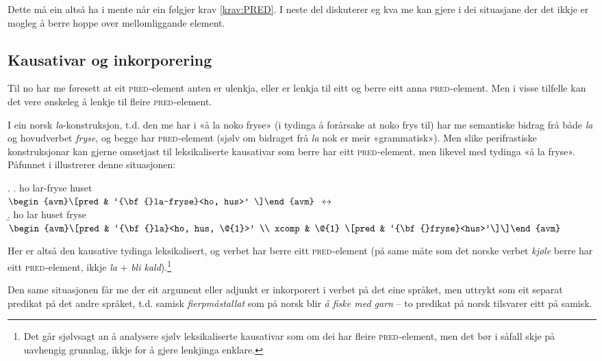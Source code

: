 \documentclass[11pt,a4paper,oneside,draft]{book}
\newcommand{\F}[2]{\textsc{#1}\ensuremath{_{#2}}}
\newcommand{\PRED}{\F{pred}{}}
\begin{document}
 Dette må ein altså ha i mente når ein følgjer krav \ref{krav:PRED}. I
 neste del diskuterer eg kva me kan gjere i dei situasjane der det
 ikkje er mogleg å berre hoppe over mellomliggande element.

\subsection{Kausativar og inkorporering}
\label{sec-3.6.5}

\label{SEC:f-mange-mange}

Til no har me føresett at eit \PRED{}-element anten er ulenkja, eller
er lenkja til eitt og berre eitt anna \PRED{}-element. Men i visse
tilfelle kan det vere ønskeleg å lenkje til fleire \PRED{}-element.

I ein norsk \emph{la}-konstruksjon, t.d. den me har i «å la noko fryse» (i
tydinga å forårsake at noko frys til) har me semantiske bidrag frå
både \emph{la} og hovudverbet \emph{fryse}, og begge har \PRED{}-element (sjølv om
bidraget frå \emph{la} nok er meir «grammatisk»). Men slike perifrastiske
konstruksjonar kan gjerne omsetjast til leksikaliserte kausativar som
berre har eitt \PRED{}-element, men likevel med tydinga «å la
fryse». Påfunnet i \Next illustrerer denne situasjonen:

{\avmoptions{}
\ex. \a. ho lar-fryse huset \\
     $\begin{avm}\[pred & `{\bf{}la-fryse}<ho, hus>' \]\end{avm}$
     $\\\\\leftrightarrow$\\
     \b. ho lar huset fryse \\
     $\begin{avm}\[pred & `{\bf{}la}<ho, hus, \@{1}>' \\
     xcomp & \@{1} \[pred & `{\bf{}fryse}<hus>'\]\]\end{avm}$

}

Her er altså den kausative tydinga leksikalisert, og verbet har berre
eitt \PRED{}-element (på same måte som det norske verbet \emph{kjøle} berre
har eitt \PRED{}-element, ikkje \emph{la} + \emph{bli kald}).\footnote{Det går sjølvsagt an å analysere sjølv leksikaliserte
        kausativar som om dei har fleire \PRED{}-element, men det bør i
        såfall skje på uavhengig grunnlag, ikkje for å gjere lenkjinga
        enklare. }

Den same situasjonen får me der eit argument eller adjunkt er
inkorporert i verbet på det eine språket, men uttrykt som eit separat
predikat på det andre språket, t.d. samisk \emph{fierpmástallat} som på
norsk blir \emph{å fiske med garn} -- to predikat på norsk tilsvarer eitt
på samisk.
\end{document}
